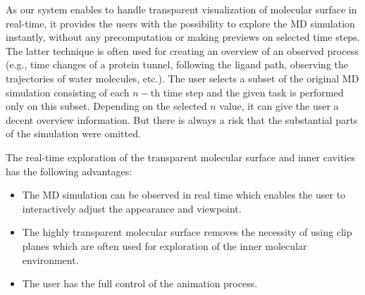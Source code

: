 As our system enables to handle transparent visualization of molecular surface in real-time, it provides the users with the possibility to explore the MD simulation instantly, without any precomputation or making previews on selected time steps.
The latter technique is often used for creating an overview of an observed process (e.g., time changes of a protein tunnel, following the ligand path, observing the trajectories of water molecules, etc.).
The user selects a subset of the original MD simulation consisting of each $n-$th time step and the given task is performed only on this subset.
Depending on the selected $n$ value, it can give the user a decent overview information. 
But there is always a risk that the substantial parts of the simulation were omitted.

The real-time exploration of the transparent molecular surface and inner cavities has the following advantages:
\begin{itemize} 
\item The MD simulation can be observed in real time which enables the user to interactively adjust the appearance and viewpoint.
\item The highly transparent molecular surface removes the necessity of using clip planes which are often used for exploration of the inner molecular environment.
\item The user has the full control of the animation process. 
\end{itemize}




